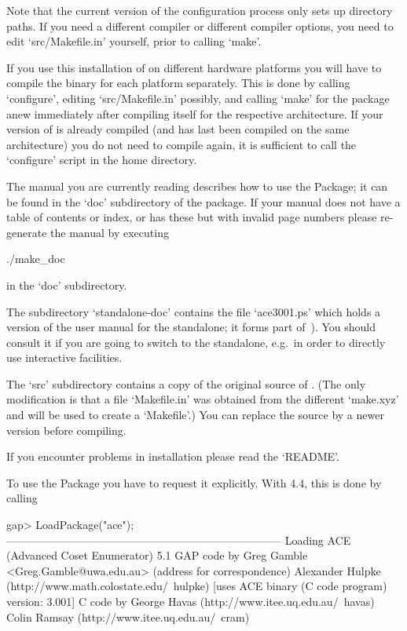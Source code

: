 Note that the  current version of the configuration  process only sets
up  directory paths.  If you  need a  different compiler  or different
compiler options, you need to edit `src/Makefile.in'  yourself,  prior
to calling `make'.

If you use this installation of {\GAP} on different hardware platforms
you will have to compile the binary for each platform separately. This
is done by calling `configure',  editing  `src/Makefile.in'  possibly,
and calling `make' for the package anew  immediately  after  compiling
{\GAP} itself for the respective  architecture.  If  your  version  of
{\GAP} is already compiled (and has last been  compiled  on  the  same
architecture)  you  do  not  need  to  compile  {\GAP}  again,  it  is
sufficient  to  call  the  `configure'  script  in  the  {\GAP}   home
directory.

The manual you are currently reading describes how to use  the  {\ACE}
Package; it can be found in the `doc' subdirectory of the package.  If
your manual does not have a table of contents or index, or  has  these
but with  invalid  page  numbers  please  re-generate  the  manual  by
executing

\begintt
./make_doc
\endtt

in the `doc' subdirectory.

The subdirectory `standalone-doc' contains the file `ace3001.ps' which
holds a version of the user manual for the {\ACE} standalone; it forms
part of~\cite{Ram99}). You should consult  it  if  you  are  going  to
switch to  the  {\ACE}  standalone,  e.g.~in  order  to  directly  use
interactive facilities.

The  `src' subdirectory  contains a  copy  of the  original source  of
{\ACE}.  (The  only modification  is  that  a  file `Makefile.in'  was
obtained from  the different `make.xyz' and  will be used  to create a
`Makefile'.)  You  can replace  the source by  a newer  version before
compiling.

If you encounter problems in installation please read the `README'.


To use the {\ACE} Package you have  to  request  it  explicitly.  With
{\GAP} 4.4, this is done by calling

\beginexample
gap> LoadPackage("ace");
---------------------------------------------------------------------------
Loading    ACE (Advanced Coset Enumerator) 5.1
GAP code by Greg Gamble <Greg.Gamble@uwa.edu.au> (address for correspondence)
       Alexander Hulpke (http://www.math.colostate.edu/~hulpke)
           [uses ACE binary (C code program) version: 3.001]
C code by  George Havas (http://www.itee.uq.edu.au/~havas)
           Colin Ramsay (http://www.itee.uq.edu.au/~cram)

